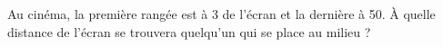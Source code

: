 
\begin{exercice}\label{exosmath-0478}

    Au cinéma, la première rangée est à \unit{3}{\meter} de l'écran et la dernière à \unit{50}{\meter}. À quelle distance de l'écran se trouvera quelqu'un qui se place au milieu ?

\end{exercice}
